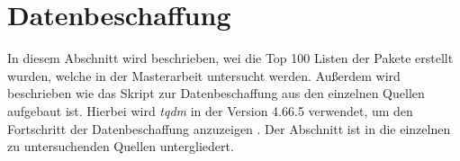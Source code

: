 \section{Datenbeschaffung}
\label{sec:datenbeschaffung}


In diesem Abschnitt wird beschrieben, wei die Top 100 Listen der Pakete erstellt wurden, welche in der Masterarbeit untersucht werden.
Außerdem wird beschrieben wie das Skript zur Datenbeschaffung aus den einzelnen Quellen aufgebaut ist.
Hierbei wird \emph{tqdm} in der Version 4.66.5 verwendet, um den Fortschritt der Datenbeschaffung anzuzeigen \autocite{costa-luis_tqdm_2024}.
Der Abschnitt ist in die einzelnen zu untersuchenden Quellen untergliedert.

